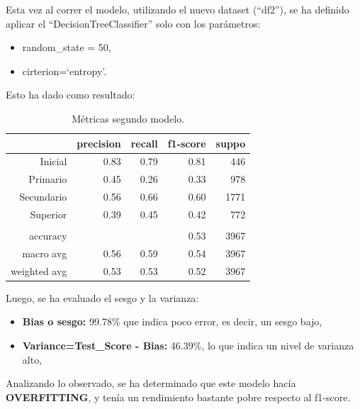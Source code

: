 \documentclass[a4paper]{article}
\begin{document}
            Esta vez al correr el modelo, utilizando el nuevo dataset (``df2''), se ha definido aplicar el ``DecisionTreeClassifier'' solo con los parámetros:
            \begin{itemize}
                \item random\_state = 50,
                \item cirterion=`entropy'.
            \end{itemize}

\vspace{1cm}
            Esto ha dado como resultado:  

            \begin{table}[!ht]
                \centering
                \begin{tabular}{rrrrr}
                    \toprule
                    ~ & precision & recall & f1-score & suppo \\ \midrule
                    Inicial    & 0.83 & 0.79 & 0.81 & 446 \\
                    Primario   & 0.45 & 0.26 & 0.33 & 978 \\
                    Secundario & 0.56 & 0.66 & 0.60 & 1771 \\
                    Superior   & 0.39 & 0.45 & 0.42 & 772 \\
                    & & & & \\
                    accuracy & & & 0.53 & 3967 \\
                    macro avg & 0.56 & 0.59 & 0.54 & 3967 \\
                    weighted avg & 0.53 & 0.53 & 0.52 & 3967 \\
                    \bottomrule
                \end{tabular}
                \caption{Métricas segundo modelo.}
                \label{Second model metrics}
            \end{table}

            Luego, se ha evaluado el sesgo y la varianza:
            \begin{itemize}
                \item \textbf{Bias o sesgo:} 99.78\% que indica poco error, es decir, un sesgo bajo,
                \item \textbf{Variance=Test\_Score - Bias:} 46.39\%, lo que indica un nivel de varianza alto,
            \end{itemize}
            
            Analizando lo observado, se ha determinado que este modelo hacía \textbf{OVERFITTING}, y tenía un rendimiento bastante pobre respecto al f1-score.
\end{document}
